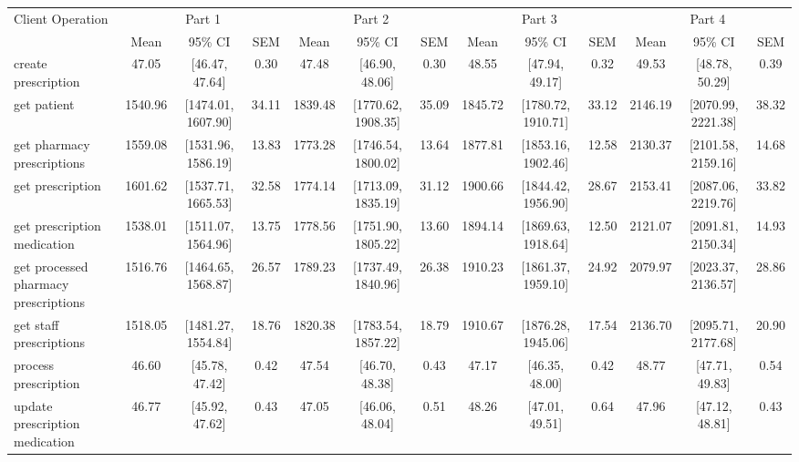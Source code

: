 \begin{tabular}{l|ccc|ccc|ccc|ccc}
\hline
Client Operation & \multicolumn{3}{c}{Part 1} & \multicolumn{3}{c}{Part 2} & \multicolumn{3}{c}{Part 3} & \multicolumn{3}{c}{Part 4} \\
  & Mean & 95\% CI & SEM & Mean & 95\% CI & SEM & Mean & 95\% CI & SEM & Mean & 95\% CI & SEM \\
\hline
 create prescription & 47.05 & [46.47, 47.64] & 0.30 & 47.48 & [46.90, 48.06] & 0.30 & 48.55 & [47.94, 49.17] & 0.32 & 49.53 & [48.78, 50.29] & 0.39 \\
 get patient & 1540.96 & [1474.01, 1607.90] & 34.11 & 1839.48 & [1770.62, 1908.35] & 35.09 & 1845.72 & [1780.72, 1910.71] & 33.12 & 2146.19 & [2070.99, 2221.38] & 38.32 \\
 get pharmacy prescriptions & 1559.08 & [1531.96, 1586.19] & 13.83 & 1773.28 & [1746.54, 1800.02] & 13.64 & 1877.81 & [1853.16, 1902.46] & 12.58 & 2130.37 & [2101.58, 2159.16] & 14.68 \\
 get prescription & 1601.62 & [1537.71, 1665.53] & 32.58 & 1774.14 & [1713.09, 1835.19] & 31.12 & 1900.66 & [1844.42, 1956.90] & 28.67 & 2153.41 & [2087.06, 2219.76] & 33.82 \\
 get prescription medication & 1538.01 & [1511.07, 1564.96] & 13.75 & 1778.56 & [1751.90, 1805.22] & 13.60 & 1894.14 & [1869.63, 1918.64] & 12.50 & 2121.07 & [2091.81, 2150.34] & 14.93 \\
 get processed pharmacy prescriptions & 1516.76 & [1464.65, 1568.87] & 26.57 & 1789.23 & [1737.49, 1840.96] & 26.38 & 1910.23 & [1861.37, 1959.10] & 24.92 & 2079.97 & [2023.37, 2136.57] & 28.86 \\
 get staff prescriptions & 1518.05 & [1481.27, 1554.84] & 18.76 & 1820.38 & [1783.54, 1857.22] & 18.79 & 1910.67 & [1876.28, 1945.06] & 17.54 & 2136.70 & [2095.71, 2177.68] & 20.90 \\
 process prescription & 46.60 & [45.78, 47.42] & 0.42 & 47.54 & [46.70, 48.38] & 0.43 & 47.17 & [46.35, 48.00] & 0.42 & 48.77 & [47.71, 49.83] & 0.54 \\
 update prescription medication & 46.77 & [45.92, 47.62] & 0.43 & 47.05 & [46.06, 48.04] & 0.51 & 48.26 & [47.01, 49.51] & 0.64 & 47.96 & [47.12, 48.81] & 0.43 \\
\hline
\end{tabular}